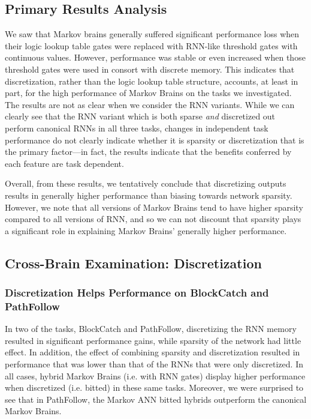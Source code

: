 \subsection{Primary Results Analysis}

We saw that Markov brains generally suffered significant performance loss when their logic lookup table gates were replaced with RNN-like threshold gates with continuous values. 
However, performance was stable or even increased when those threshold gates were used in consort with discrete memory. 
This indicates that discretization, rather than the logic lookup table structure, accounts, at least in part, for the high performance of Markov Brains on the tasks we investigated. 
The results are not as clear when we consider the RNN variants. 
While we can clearly see that the RNN variant which is both sparse \textit{and} discretized out perform canonical RNNs in all three tasks, changes in independent task performance do not clearly indicate whether it is sparsity or discretization that is the primary factor---in fact, the results indicate that the benefits conferred by each feature are task dependent.

Overall, from these results, we tentatively conclude that discretizing outputs results in generally higher performance than biasing towards network sparsity. 
However, we note that all versions of Markov Brains tend to have higher sparsity compared to all versions of RNN, and so we can not discount that sparsity plays a significant role in explaining Markov Brains' generally higher performance.

\subsection{Cross-Brain Examination: Discretization}

\subsubsection{Discretization Helps Performance on BlockCatch and PathFollow} In two of the tasks, BlockCatch and PathFollow,  discretizing the RNN memory resulted in significant performance gains, while sparsity of the network had little effect. 
In addition, the effect of combining sparsity and discretization resulted in performance that was lower than that of the RNNs that were only discretized.
In all cases, hybrid Markov Brains (i.e. with RNN gates) display higher performance when discretized (i.e. bitted) in these same tasks. 
Moreover, we were surprised to see that in PathFollow, the Markov ANN bitted hybrids outperform the canonical Markov Brains.

